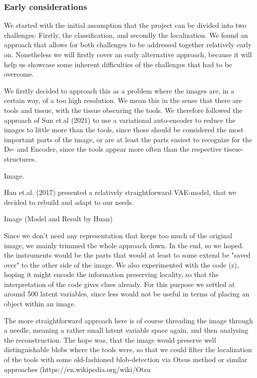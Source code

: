 \subsubsection{Early considerations}

We started with the initial assumption that the project can be divided into two challenges: Firstly, the classification, and secondly the localization. We found an approach that allows for both challenges to be addressed together relatively early on. Nonetheless we will firstly cover an early alternative approach, because it will help us showcase some inherent difficulties of the challenges that had to be overcome.

We firstly decided to approach this as a problem where the images are, in a certain way, of a too high resolution. We mean this in the sense that there are tools and tissue, with the tissue obscuring the tools. We therefore followed the approach of Sun et.al (2021) to use a variational auto-encoder to reduce the images to little more than the tools, since those should be considered the most important parts of the image, or are at least the parts easiest to recognize for the De- and Encoder, since the tools appear more often than the respective tissue-structures.

Image.

Han et.al. (2017) presented a relatively straightforward VAE-model, that we decided to rebuild and adapt to our needs. 

Image (Model and Result by Huan)

Since we don't need any representation that keeps too much of the original image, we mainly trimmed the whole approach down.
In the end, so we hoped. the instruments would be the parts that would at least to some extend be "saved over" to the other side of the image. We also experimented with the code (z), hoping it might encode the information preserving locality, so that the interpretation of the code gives clues already. For this purpose we settled at around 500 latent variables, since less would not be useful in terms of placing an object within an image. 

The more straightforward approach here is of course threading the image through a needle, meaning a rather small latent variable space again, and then analysing the reconstruction. The hope was, that the image would preserve well distinguishable blobs where the tools were, so that we could filter the localization of the tools with some old-fashioned blob-detection via Otsus method or similar approaches (https://en.wikipedia.org/wiki/Otsu%

